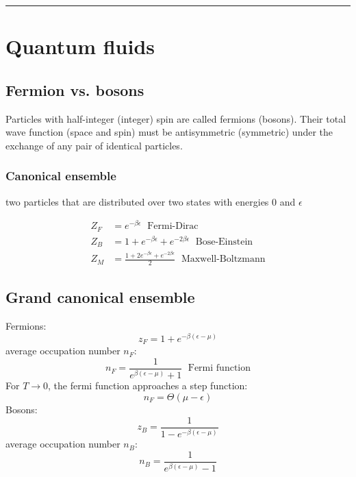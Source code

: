 \noindent\rule[1ex]{\textwidth/5}{1pt}
\section{Quantum fluids}

\subsection*{Fermion vs. bosons}
Particles with half-integer (integer) spin are called fermions (bosons). Their
total wave function (space and spin) must be antisymmetric (symmetric)
under the exchange of any pair of identical particles.

\subsubsection*{Canonical ensemble}
two particles that are distributed over two states with energies 0 and $\epsilon$

\begin{equation*}
    \begin{aligned}
        Z_F &= e^{-\beta \epsilon} \; \text{ Fermi-Dirac} \\
        Z_B &= 1+ e^{-\beta \epsilon} + e^{-2\beta \epsilon} \; \text{ Bose-Einstein} \\
        Z_M &= \frac{1+ 2e^{-\beta \epsilon} + e^{-2\beta \epsilon}}{2} \; \text{ Maxwell-Boltzmann}
    \end{aligned}
\end{equation*}

\subsection*{Grand canonical ensemble}
Fermions:
\begin{equation*}
    z_F = 1+e^{-\beta(\epsilon-\mu)}
\end{equation*}
average occupation number $n_F$:
\begin{equation*}
    n_F = \frac{1}{e^{\beta(\epsilon - \mu)}+1} \; \text{ Fermi function}
\end{equation*}
For $T \rightarrow 0$, the fermi function approaches a step function:
\begin{equation*}
    n_F = \Theta (\mu - \epsilon)
\end{equation*}
Bosons:
\begin{equation*}
    z_B = \frac{1}{1-e^{-\beta(\epsilon-\mu)}}
\end{equation*}
average occupation number $n_B$:
\begin{equation*}
    n_B = \frac{1}{e^{\beta(\epsilon - \mu)}-1}
\end{equation*}

